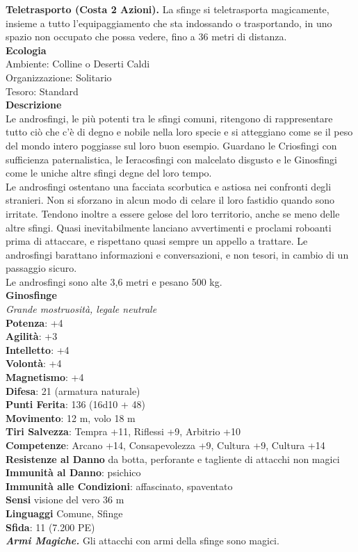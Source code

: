 \begin{multicols}{2}
\textbf{Teletrasporto (Costa 2 Azioni).} La sfinge si teletrasporta magicamente, insieme a tutto l'equipaggiamento che sta indossando o trasportando, in uno spazio non occupato che possa vedere, fino a 36 metri di distanza.\\
\textbf{Ecologia}\\
Ambiente: Colline o Deserti Caldi\\
Organizzazione: Solitario\\
Tesoro: Standard\\
\textbf{Descrizione}\\
Le androsfingi, le più potenti tra le sfingi comuni, ritengono di rappresentare tutto ciò che c'è di degno e nobile nella loro specie e si atteggiano come se il peso del mondo intero poggiasse sul loro buon esempio. Guardano le Criosfingi con sufficienza paternalistica, le Ieracosfingi con malcelato disgusto e le Ginosfingi come le uniche altre sfingi degne del loro tempo.\\

Le androsfingi ostentano una facciata scorbutica e astiosa nei confronti degli stranieri. Non si sforzano in alcun modo di celare il loro fastidio quando sono irritate. Tendono inoltre a essere gelose del loro territorio, anche se meno delle altre sfingi. Quasi inevitabilmente lanciano avvertimenti e proclami roboanti prima di attaccare, e rispettano quasi sempre un appello a trattare. Le androsfingi barattano informazioni e conversazioni, e non tesori, in cambio di un passaggio sicuro.\\
Le androsfingi sono alte 3,6 metri e pesano 500 kg.\\


\medskip\textbf{Ginosfinge}\\
\emph{Grande mostruosità, legale neutrale}\\
\textbf{Potenza}: +4\\
\textbf{Agilità}: +3\\
\textbf{Intelletto}: +4\\
\textbf{Volontà}: +4\\
\textbf{Magnetismo}: +4\\
\textbf{Difesa}: 21 (armatura naturale)\\
\textbf{Punti Ferita}: 136 (16d10 + 48)\\
\textbf{Movimento}: 12 m, volo 18 m\\
\textbf{Tiri Salvezza}: Tempra +11, Riflessi +9, Arbitrio +10\\
\textbf{Competenze}: Arcano +14, Consapevolezza +9, Cultura +9, Cultura +14\\
\textbf{Resistenze al Danno} da botta, perforante e tagliente di attacchi non magici\\
\textbf{Immunità al Danno}: psichico\\
\textbf{Immunità alle Condizioni}: affascinato, spaventato\\
\textbf{Sensi} visione del vero 36 m\\
\textbf{Linguaggi} Comune, Sfinge\\
\textbf{Sfida}: 11 (7.200 PE)\smallskip\\
\emph{\textbf{Armi Magiche.}} Gli attacchi con armi della sfinge sono magici.


\end{multicols}
